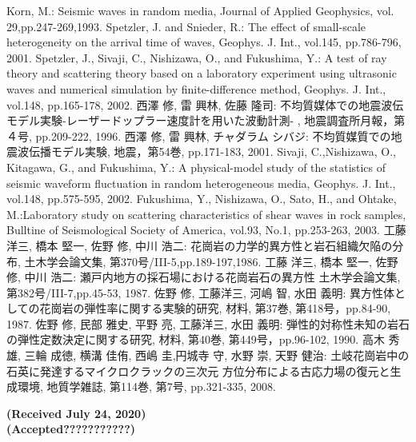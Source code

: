 \documentclass{jsce}
\begin{document}
\begin{thebibliography}{99}
\begin{spacing}{1.175}
	Korn, M.: Seismic waves in random media, 
	Journal of Applied Geophysics, vol. 29,pp.247-269,1993.
	Spetzler, J. and Snieder, R.: The effect of small-scale heterogeneity on the arrival time of waves, 
	Geophys. J. Int., vol.145, pp.786-796, 2001. 
	Spetzler, J., Sivaji, C., Nishizawa, O., and Fukushima, Y.: A test of ray theory and scattering theory based on
	a laboratory experiment using ultrasonic waves and numerical simulation by finite-difference method, 
	Geophys. J. Int., vol.148, pp.165-178, 2002. 
\newpage
{}
	西澤 修, 雷 興林, 佐藤 隆司: 不均質媒体での地震波伝モデル実験-レーザードップラー速度計を用いた波動計測-
	, 地震調査所月報，第４号, pp.209-222, 1996.
	西澤 修, 雷 興林, チャダラム シバジ: 不均質媒質での地震波伝播モデル実験, 
	地震，第54巻, pp.171-183, 2001.
	Sivaji, C.,Nishizawa, O., Kitagawa, G., and Fukushima, Y.: 
	A physical-model study of the statistics of seismic waveform fluctuation in random heterogeneous media, 
	Geophys. J. Int., vol.148, pp.575-595, 2002. 
	Fukushima, Y., Nishizawa, O., Sato, H., and Ohtake, M.:Laboratory study on scattering characteristics of shear waves 
	in rock samples, Bulltine of Seismological Society of America, vol.93, No.1, pp.253-263, 2003.
	工藤 洋三, 橋本 堅一, 佐野 修, 中川 浩二: 花崗岩の力学的異方性と岩石組織欠陥の分布, 
	土木学会論文集, 第370号/III-5,pp.189-197,1986.
	工藤 洋三, 橋本 堅一, 佐野 修, 中川 浩二: 瀬戸内地方の採石場における花崗岩石の異方性
	土木学会論文集, 第382号/III-7,pp.45-53, 1987.
	佐野 修, 工藤洋三, 河嶋 智, 水田 義明: 異方性体としての花崗岩の弾性率に関する実験的研究, 
	材料, 第37巻, 第418号，pp.84-90, 1987.
	佐野 修, 民部 雅史, 平野 亮, 工藤洋三, 水田 義明: 弾性的対称性未知の岩石の弾性定数決定に関する研究, 
	材料, 第40巻, 第449号，pp.96-102, 1990.
	高木 秀雄, 三輪 成徳, 横溝 佳侑, 西嶋 圭,円城寺 守, 水野 崇, 天野 健治: 土岐花崗岩中の石英に発達するマイクロクラックの三次元
	方位分布による古応力場の復元と生成環境, 地質学雑誌, 第114巻, 第7号, pp.321-335, 2008.
\end{spacing}
\end{thebibliography}
\begin{flushright}
	\small
	\bf{ (Received July 24, 2020)\\
	(Accepted???????????)}
\end{flushright}
\end{document}
